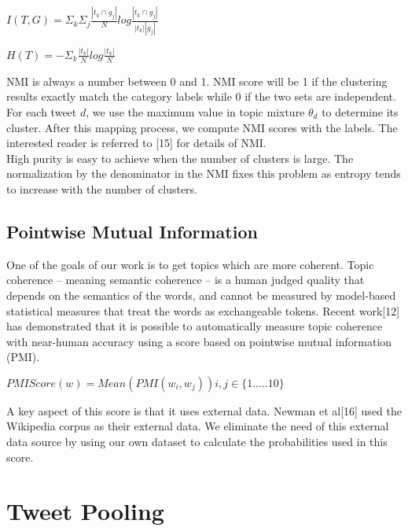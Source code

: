\documentclass[10pt,a5paper,twoside]{article}
\begin{document}
\begin{center}
$ I(T,G) = \Sigma_{k} \Sigma_{j} \frac{|t_{k} \cap g_{j}|}{N} log \frac{|t_{k} \cap g_{j}|}{|t_{k}| |g_{j}|} $
\end{center}

\begin{center}
$ H(T) = - \Sigma_k \frac{|t_k|}{N} log \frac{|t_k|}{N} $
\end{center}

NMI is always a number between 0 and 1. NMI score will be 1 if the clustering results exactly match the category labels while 0 if the two sets are independent. For each tweet $d$, we use the maximum value in topic mixture $ \theta_{d} $ to determine its cluster. After this mapping process, we compute NMI scores with the labels. The interested reader is referred to [15] for details of NMI.
\\
High purity is easy to achieve when the number of clusters is large. The normalization by the denominator in the NMI fixes this problem as entropy tends to increase with the number of clusters.

\subsection{Pointwise Mutual Information}

One of the goals of our work is to get topics which are more coherent. Topic coherence – meaning semantic coherence – is a human judged quality that depends on the semantics of the words, and cannot be measured by model-based statistical measures that treat the words as exchangeable tokens. Recent work[12] has demonstrated that it is possible to automatically measure topic coherence with near-human accuracy using a score based on pointwise mutual information (PMI).

\begin{center}
$ PMI Score(w) = Mean ( PMI(w_i,w_j) ) i,j \in \lbrace1.....10\rbrace $
\end{center}

A key aspect of this score is that it uses external data. Newman et al[16] used the Wikipedia corpus as their external data. We eliminate the need of this external data source by using our own dataset to calculate the probabilities used in this score.\\


\section{Tweet Pooling}
\end{document}
